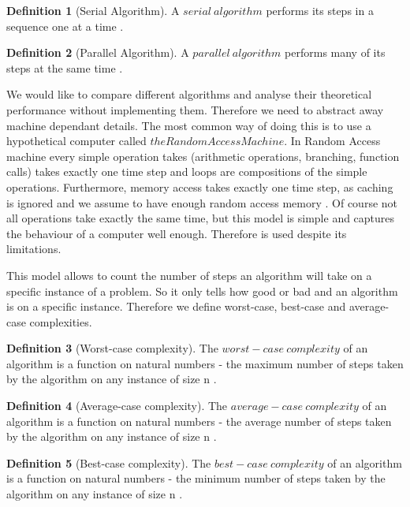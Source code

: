 \documentclass{report}
\theoremstyle{plain}
\theoremstyle{definition}
\newtheorem{definition}{Definition}
\theoremstyle{remark}
\numberwithin{definition}{chapter}
\numberwithin{example}{chapter}
\numberwithin{figure}{chapter}
\numberwithin{theorem}{chapter}
\numberwithin{lemma}{chapter}
\begin{document}
\begin{definition}[Serial Algorithm]
A $serial \ algorithm$ performs its steps in a sequence one at a time \cite{berman1996fundamentals}.
\end{definition}

\begin{definition}[Parallel Algorithm]
A $parallel \ algorithm$ performs many of its steps at the same time \cite{berman1996fundamentals}.
\end{definition}

We would like to compare different algorithms and analyse their theoretical performance without implementing them. Therefore we need to abstract away machine dependant details. The most common way of doing this is to use a hypothetical computer called $the Random Access Machine$. In Random Access machine every simple operation takes (arithmetic operations, branching, function calls) takes exactly one time step and loops are compositions of the simple operations. Furthermore, memory access takes exactly one time step, as caching is ignored and we assume to have enough random access memory \cite{skiena504algorithm}. Of course not all operations take exactly the same time, but this model is simple and captures the behaviour of a computer well enough. Therefore is used despite its limitations.

This model allows to count the number of steps an algorithm will take on a specific instance of a problem. So it only tells how good or bad and an algorithm is on a specific instance. Therefore we define worst-case, best-case and average-case complexities.

\begin{definition}[Worst-case complexity]
The $worst-case \ complexity$ of an algorithm is a function on natural numbers - the maximum number of steps taken by the algorithm on any instance of size n \cite{skiena504algorithm}.
\end{definition}

\begin{definition}[Average-case complexity]
The $average-case \ complexity$ of an algorithm is a function on natural numbers - the average number of steps taken by the algorithm on any instance of size n \cite{skiena504algorithm}.
\end{definition}

\begin{definition}[Best-case complexity]
The $best-case \ complexity$ of an algorithm is a function on natural numbers - the minimum number of steps taken by the algorithm on any instance of size n \cite{skiena504algorithm}.
\end{definition}
\end{document}
